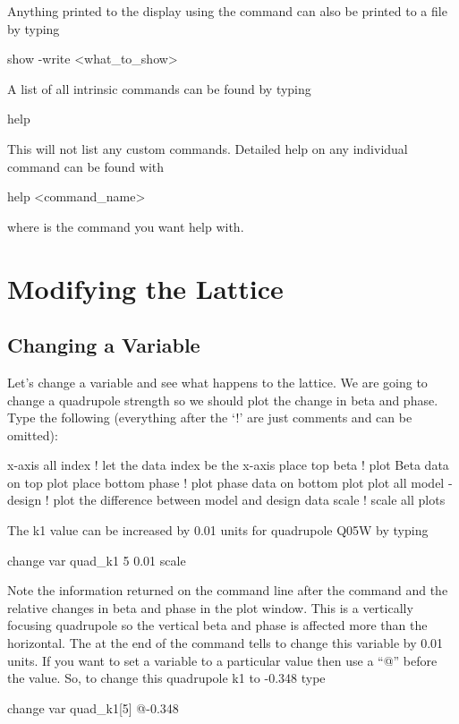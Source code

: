 Anything printed to the display using the  command can also
be printed to a file by typing
\begin{example}
  show -write <what_to_show>
\end{example}

A list of all intrinsic  commands can be found by typing
\begin{example}
  help
\end{example}
This will not list any custom commands. Detailed help on any
individual command can be found with
\begin{example}
  help <command\_name>
\end{example}
where  is the command you want help with.

\section{Modifying the Lattice}
\label{s:modify.lattice}

\subsection{Changing a Variable}
\label{ss:change_variable}

Let's change a variable and see what happens to the lattice. We are going to
change a quadrupole strength so we should plot the change in beta and phase.
Type the following (everything after the `!' are just comments and can be
omitted):
\begin{example}
  x-axis all index        ! let the data index be the x-axis
  place top beta          ! plot Beta data on top plot
  place bottom phase      ! plot phase data on bottom plot
  plot all model - design ! plot the difference between model and design data
  scale                   ! scale all plots
\end{example}

The k1 value can be increased by 0.01 units for quadrupole Q05W by typing
\begin{example}
  change var quad\_k1 5 0.01
  scale
\end{example}
Note the information returned on the command line after the command
and the relative changes in beta and phase in the plot window. This is
a vertically focusing quadrupole so the vertical beta and phase is
affected more than the horizontal. The  at the end of the
command tells \tao to change this variable by 0.01 units. If you want
to set a variable to a particular value then use a ``@'' before the
value. So, to change this quadrupole k1 to -0.348 type
\begin{example}
  change var quad\_k1[5] @-0.348
\end{example}

